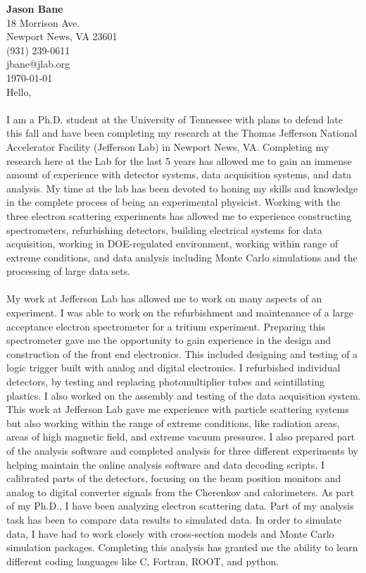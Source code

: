 \documentclass[12pt,letterpaper]{article}
\newcommand{\CPP}
{C\nolinebreak[4]\hspace{-.05em}\raisebox{.22ex}{\footnotesize\bf ++}}
\begin{document}
\vspace*{-1.2cm}
{\textbf{Jason Bane}}\\
18 Morrison Ave. \\
Newport News, VA 23601 \\
(931) 239-0611 \\
jbane@jlab.org \\
\today\\

Hello, 

\paragraph{}I am a Ph.D. student at the University of Tennessee with plans to defend late this fall and have been completing my research at the Thomas Jefferson National Accelerator Facility (Jefferson Lab) in Newport News, VA. Completing my research here at the Lab for the last 5 years has allowed me to gain an immense amount of experience with detector systems, data acquisition systems, and data analysis. My time at the lab has been devoted to honing my skills and knowledge in the complete process of being an experimental physicist. Working with the three electron scattering experiments has allowed me to experience constructing spectrometers, refurbishing detectors, building electrical systems for data acquisition, working in DOE-regulated environment, working within range of extreme conditions, and data analysis including Monte Carlo simulations and the processing of large data sets.  
\paragraph{}My work at Jefferson Lab has allowed me to work on many aspects of an experiment. I was able to work on the refurbishment and maintenance of a large acceptance electron spectrometer for a tritium experiment. Preparing this spectrometer gave me the opportunity to gain experience in the design and construction of the front end electronics. This included designing and testing of a logic trigger built with analog and digital electronics. I refurbished individual detectors, by testing and replacing photomultiplier tubes and scintillating plastics.  I also worked on the assembly and testing of the data acquisition system. This work at Jefferson Lab gave me experience with particle scattering systems but also working within the range of extreme conditions, like radiation areas, areas of high magnetic field, and extreme vacuum pressures. I also prepared part of the analysis software and completed analysis for three different experiments by helping maintain the online analysis software and data decoding scripts. I calibrated parts of the detectors, focusing on the beam position monitors and analog to digital converter signals from the Cherenkov and calorimeters. As part of my Ph.D., I have been analyzing electron scattering data. Part of my analysis task has been to compare data results to simulated data. In order to simulate data, I have had to work closely with cross-section models and Monte Carlo simulation packages. Completing this analysis has granted me the ability to learn different coding languages like \CPP, Fortran, ROOT, and python. 
\end{document}
